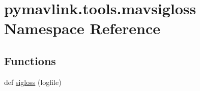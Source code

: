 \hypertarget{namespacepymavlink_1_1tools_1_1mavsigloss}{}\section{pymavlink.\+tools.\+mavsigloss Namespace Reference}
\label{namespacepymavlink_1_1tools_1_1mavsigloss}
\subsection*{Functions}
\begin{DoxyCompactItemize}
\item 
def \hyperlink{namespacepymavlink_1_1tools_1_1mavsigloss_a15d6bb0d2eb142440ea44a1feb3b7b8c}{sigloss} (logfile)
\end{DoxyCompactItemize}
